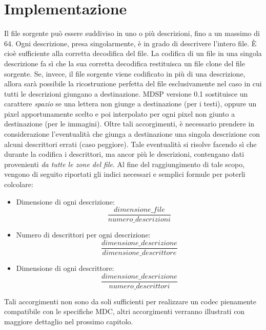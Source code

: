 \chapter{Implementazione}
\label{cap:implementazione_codec}
Il file sorgente pu\`o essere suddiviso in uno o pi\`u descrizioni, fino a un massimo di 64. Ogni descrizione, presa singolarmente, \`e in grado di descrivere l'intero file. \`E cio\`e sufficiente alla corretta decodifica del file. La codifica di un file in una singola descrizione fa s\`i che la sua corretta decodifica restituisca un file clone del file sorgente. Se, invece, il file sorgente viene codificato in pi\`u di una descrizione, allora sarà possibile la ricostruzione perfetta del file esclusivamente nel caso in cui tutti le descrizioni giungano a destinazione.
MDSP versione 0.1 sostituisce un carattere \emph{spazio} se una lettera non giunge a destinazione (per i testi), oppure un pixel apportunamente scelto e poi interpolato per ogni pixel non giunto a destinazione (per le immagini). Oltre tali accorgimenti, è necessario prendere in considerazione l'eventualità che giunga a destinazione una singola descrizione con alcuni descrittori errati (caso peggiore). Tale eventualit\`a si risolve facendo s\`i che durante la codifica i descrittori, ma ancor pi\`u le descrizioni, contengano dati provenienti \emph{da tutte le zone del file}. Al fine del raggiungimento di tale scopo, vengono di seguito riportati gli indici necessari e semplici formule per poterli colcolare:
\begin{itemize}
 \item Dimensione di ogni descrizione: $$\frac{dimensione\_file}{numero\_descrizioni}$$
 \item Numero di descrittori per ogni descrizione: $$\frac{dimensione\_descrizione}{dimensione\_descrittore}$$
 \item Dimensione di ogni descrittore: $$\frac{dimensione\_descrizione}{numero\_descrittori}$$
\end{itemize}
Tali accorgimenti non sono da soli sufficienti per realizzare un codec pienamente compatibile con le specifiche MDC, altri accorgimenti verranno illustrati con maggiore dettaglio nel prossimo capitolo.
